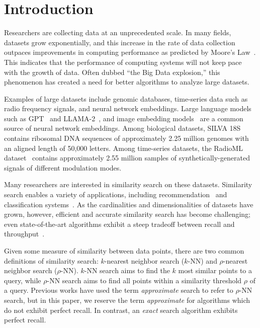 \section{Introduction}
\label{sec:introduction}

Researchers are collecting data at an unprecedented scale.
In many fields, datasets grow exponentially, and this increase in the rate of data collection outpaces improvements in computing performance as predicted by Moore's Law~\cite{kahn2011future}.
This indicates that the performance of computing systems will not keep pace with the growth of data.
Often dubbed ``the Big Data explosion,'' this phenomenon has created a need for better algorithms to analyze large datasets.

Examples of large datasets include genomic databases, time-series data such as radio frequency signals, and neural network embeddings.
Large language models such as GPT~\cite{2020arXiv200514165B, OpenAI2023GPT4TR} and LLAMA-2~\cite{Touvron2023Llama2O}, and image embedding models~\cite{radford2021learning, dosovitskiy2020image} are a common source of neural network embeddings.
Among biological datasets,  SILVA 18S~\cite{10.1093/nar/gks1219} contains ribosomal DNA sequences of approximately 2.25 million genomes with an aligned length of 50,000 letters.
Among time-series datasets, the RadioML dataset~\cite{oshea2018radioml} contains approximately 2.55 million samples of synthetically-generated signals of different modulation modes.

Many researchers are interested in similarity search on these datasets.
Similarity search enables a variety of applications, including recommendation~\cite{annoy} and classification systems~\cite{suyanto2022knnclassifier}.
As the cardinalities and dimensionalities of datasets have grown, however, efficient and accurate similarity search has become challenging;
even state-of-the-art algorithms exhibit a steep tradeoff between recall and throughput~\cite{Malkov2016EfficientAR, johnson2019billion, annoy, aumuller2020ann}.

Given some measure of similarity between data points, there are two common definitions of similarity search: $k$-nearest neighbor search ($k$-NN) and $\rho$-nearest neighbor search ($\rho$-NN).
$k$-NN search aims to find the $k$ most similar points to a query, while $\rho$-NN search aims to find all points within a similarity threshold $\rho$ of a query.
Previous works have used the term \textit{approximate} search to refer to $\rho$-NN search, but in this paper, we reserve the term \textit{approximate} for algorithms which do not exhibit perfect recall.
In contrast, an \textit{exact} search algorithm exhibits perfect recall.

